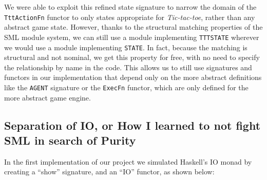 \documentclass[9pt,letterpaper]{extarticle}
\begin{document}
  We were able to exploit this refined state signature to narrow the domain of the \texttt{TttActionFn}
  functor to only states appropriate for \textit{Tic-tac-toe}, rather than any abstract game state.
  However, thanks to the structural matching properties of the SML module system, we can still
  use a module implementing \texttt{TTTSTATE} wherever we would use a module implementing
  \texttt{STATE}. In fact, because the matching is structural and not nominal, we get this property
  for free, with no need to specify the relationship by name in the code. This allows us to still use
  signatures and functors in our implementation that depend only on the more abstract 
  definitions like the \texttt{AGENT} signature
  or the \texttt{ExecFn} functor, which are only defined for the more abstract game engine. 
  
  \subsection{Separation of IO, or How I learned to not fight SML in search of Purity}
  In the first implementation of our project we simulated Haskell's IO monad by
  creating a ``show'' signature, and an ``IO'' functor, as shown below:
\end{document}
